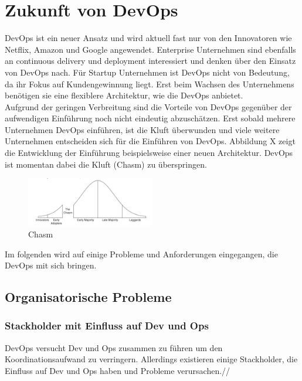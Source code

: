 \chapter{Zukunft von DevOps}

DevOps ist ein neuer Ansatz und wird aktuell fast nur von den Innovatoren wie Netflix, Amazon und Google angewendet. Enterprise Unternehmen sind ebenfalls an continuous delivery und deployment interessiert und denken über den Einsatz von DevOps nach. Für Startup Unternehmen ist DevOps nicht von Bedeutung, da ihr Fokus auf Kundengewinnung liegt. Erst beim Wachsen des Unternehmens benötigen sie eine flexiblere Architektur, wie die DevOps anbietet. \\
Aufgrund der geringen Verbreitung sind die Vorteile von DevOps gegenüber der aufwendigen Einführung noch nicht eindeutig abzuschätzen. Erst sobald mehrere Unternehmen DevOps einführen, ist die Kluft überwunden und viele weitere Unternehmen entscheiden sich für die Einführen von DevOps. Abbildung X zeigt die Entwicklung der Einführung beispielsweise einer neuen Architektur. DevOps ist momentan dabei die Kluft (Chasm) zu überspringen. 

\begin{figure}[htbp]
  \centering
  \includegraphics[width=0.5\textwidth]{pictures/chasm.png}
	\caption{Chasm}
	\label{Chasm}
\end{figure} 

Im folgenden wird auf einige Probleme und Anforderungen eingegangen, die DevOps mit sich bringen.

\section{Organisatorische Probleme}

\subsection{Stackholder mit Einfluss auf Dev und Ops}
DevOps versucht Dev und Ops zusammen zu führen um den Koordinationsaufwand zu verringern. Allerdings existieren einige Stackholder, die Einfluss auf Dev und Ops haben und Probleme verursachen.//

